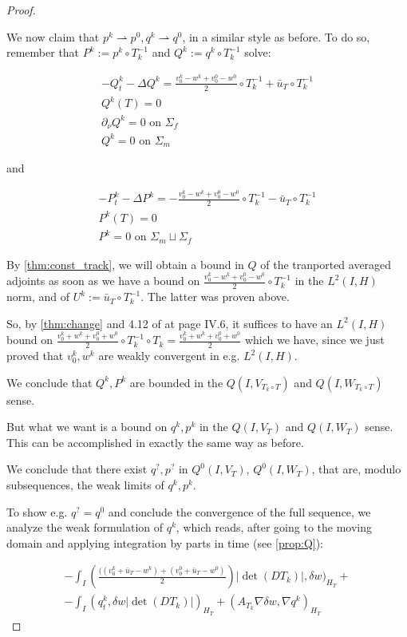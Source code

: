 \documentclass[english,a4paper,12pt,oneside]{scrbook}
\theoremstyle{break}
\newenvironment{mproof}[1][\proofname]{%
  \begin{proof}[#1]$ $\par\nobreak\ignorespaces
}{%
  \end{proof}
}
\renewcommand*{\proofname}{Proof}
\theoremstyle{remark}
\newcommand{\ds}{\displaystyle}
\newcommand{\weakc}{\rightharpoonup}
\begin{document}
\begin{mproof}
We now claim that $p^k \weakc p^0, q^k\weakc q^0$, in a similar style as before. To do so, remember that $P^k:=p^k\circ T_k^{-1}$ and $Q^k:=q^k\circ T_k^{-1}$ solve:

\begin{align*}
-Q^k_t-\Delta Q^k =\frac{v_0^k-w^k+v_0^0-w^0}{2}\circ T_k^{-1}+\bar{u}_T\circ T_k^{-1} \\
Q^k(T)=0\\
\partial_\nu Q^k = 0 \text{ on } \Sigma_f\\
Q^k = 0 \text{ on } \Sigma_m
\end{align*}

and

\begin{align*}
-P^k_t-\Delta P^k =-\frac{v_0^k-w^k+v_0^0-w^0}{2}\circ T_k^{-1}-\bar{u}_T\circ T_k^{-1} \\
P^k(T)=0\\
P^k = 0 \text{ on } \Sigma_m \sqcup \Sigma_f
\end{align*}

By \cref{thm:const_track}, we will obtain a bound in $Q$ of the tranported averaged adjoints as soon as we have a bound on $\ds \frac{v_0^k-w^k+v_0^0-w^0}{2}\circ T_k^{-1}$ in the $L^2(I,H)$ norm, and of $U^k:=\bar{u}_T\circ T_k^{-1}$. The latter was proven above.

So, by \cref{thm:change} and 4.12 of \cite{murat} at page IV.6, it suffices to have an $L^2(I,H)$ bound on $\ds \frac{v_0^k+w^k+v_0^0+w^0}{2}\circ T_k^{-1}\circ T_k = \frac{v_0^k+w^k+v_0^0+w^0}{2}$ which we have, since we just proved that $v_0^k, w^k$ are weakly convergent in e.g. $L^2(I,H)$.

We conclude that $Q^k,P^k$ are bounded in the $Q(I,V_{T_k\circ T})$ and $Q(I,W_{T_k\circ T})$ sense.

But what we want is a bound on $q^k, p^k$ in the $Q(I,V_{ T})$ and $Q(I,W_{ T})$ sense. This can be accomplished in exactly the same way as before.

We conclude that there exist $q^?, p^?$ in $Q^0(I,V_{ T})$, $Q^0(I,W_{ T})$, that are, modulo subsequences, the weak limits of $q^k, p^k$.

To show e.g. $q^?=q^0$ and conclude the convergence of the full sequence, we analyze the weak formulation of $q^k$, which reads, after going to the moving domain and applying integration by parts in time (see \ref{prop:Q}):

\begin{align*}
-\int_I \left (\frac{((v_0^k+\bar{u}_T - w^k)+(v_0^0+\bar{u}_T - w^0)}{2}\right )|\det(DT_k)|,\delta w)_{H_T}+\\
-\int_I (  q^k_t ,   \delta w |\det(DT_k)|)_{H_T}+ (A_{T_k}\nabla \delta w, \nabla q^k)_{H_T}
\end{align*}


\end{mproof}
\end{document}
